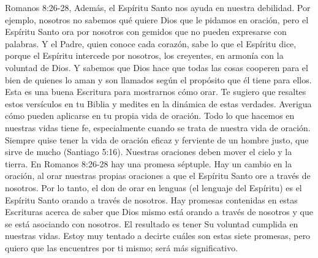 \documentclass[twoside, 12pt]{book}
\begin{document}
Romanos 8:26-28, Además, el Espíritu Santo nos ayuda en nuestra debilidad. Por ejemplo, nosotros no sabemos qué quiere Dios que le pidamos en oración, pero el Espíritu Santo ora por nosotros con gemidos que no pueden expresarse con palabras. Y el Padre, quien conoce cada corazón, sabe lo que el Espíritu dice, porque el Espíritu intercede por nosotros, los creyentes, en armonía con la voluntad de Dios. Y sabemos que Dios hace que todas las cosas cooperen para el bien de quienes lo aman y son llamados según el propósito que él tiene para ellos.
Esta es una buena Escritura para mostrarnos cómo orar. Te sugiero que resaltes estos versículos en tu Biblia y medites en la dinámica de estas verdades. Averigua cómo pueden aplicarse en tu propia vida de oración. Todo lo que hacemos en nuestras vidas tiene fe, especialmente cuando se trata de nuestra vida de oración. Siempre quise tener la vida de oración eficaz y ferviente de un hombre justo, que sirve de mucho (Santiago 5:16). Nuestras oraciones deben mover el cielo y la tierra. En Romanos 8:26-28 hay una promesa séptuple. Hay un cambio en la oración, al orar nuestras propias oraciones a que el Espíritu Santo ore a través de nosotros. Por lo tanto, el don de orar en lenguas (el lenguaje del Espíritu) es el Espíritu Santo orando a través de nosotros. Hay promesas contenidas en estas Escrituras acerca de saber que Dios mismo está orando a través de nosotros y que se está asociando con nosotros. El resultado es tener Su voluntad cumplida en nuestras vidas. Estoy muy tentado a decirte cuáles son estas siete promesas, pero quiero que las encuentres por ti mismo; será más significativo.\\
\end{document}
